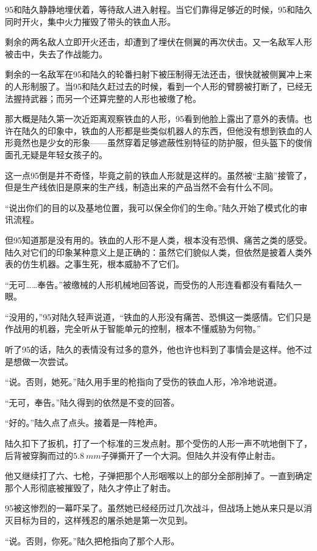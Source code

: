 95和陆久静静地埋伏着，等待敌人进入射程。当它们靠得足够近的时候，95和陆久同时开火，集中火力摧毁了带头的铁血人形。

剩余的两名敌人立即开火还击，却遭到了埋伏在侧翼的再次伏击。又一名敌军人形被击中，失去了作战能力。

剩余的一名敌军在95和陆久的轮番扫射下被压制得无法还击，很快就被侧翼冲上来的人形制服了。当95和陆久赶过去的时候，看到一个人形的臂膀被打断了，已经无法握持武器；而另一个还算完整的人形也被缴了枪。

那大概是陆久第一次近距离观察铁血的人形，95看到他脸上露出了意外的表情。也许在陆久的印象中，铁血的人形都是些类似机器人的东西，但他没有想到铁血的人形竟然也是少女的形象——虽然穿着足够遮蔽性别特征的防护服，但头盔下的俊俏面孔无疑是年轻女孩子的。

这一点95倒是并不奇怪，毕竟之前的铁血人形就是这样的。虽然被“主脑”接管了，但是生产线依旧是原来的生产线，制造出来的产品当然不会有什么不同。

“说出你们的目的以及基地位置，我可以保全你们的生命。”陆久开始了模式化的审讯流程。

但95知道那是没有用的。铁血的人形不是人类，根本没有恐惧、痛苦之类的感受。陆久对它们的印象某种意义上是正确的：虽然它们貌似人类，但依然是披着人类外表的仿生机器。之事生死，根本威胁不了它们。

“无可……奉告。”被缴械的人形机械地回答说，而受伤的人形连看都没有看陆久一眼。

“没用的，”95对陆久轻声说道，“铁血的人形没有痛苦、恐惧这一类感情。它们只是作战用的机器，完全听从于智能单元的控制，根本不懂威胁为何物。”

听了95的话，陆久的表情没有过多的意外，他也许也料到了事情会是这样。他不过是想做一次尝试。

“说。否则，她死。”陆久用手里的枪指向了受伤的铁血人形，冷冷地说道。

“无可，奉告。”陆久得到的依然是不变的回答。

“好的。”陆久点了点头。接着是一阵枪声。

陆久扣下了扳机，打了一个标准的三发点射。那个受伤的人形一声不吭地倒下了，后背被穿胸而过的$\SI{5.8}{mm}$子弹撕开了一个大洞。但陆久并没有停止射击。

他又继续打了六、七枪，子弹把那个人形咽喉以上的部分全部削掉了。一直到确定那个人形彻底被摧毁了，陆久才停止了射击。

95被这惨烈的一幕吓呆了。虽然她已经经历过几次战斗，但战场上她从来只是以消灭目标为目的，这样残忍的屠杀她是第一次见到。

“说。否则，你死。”陆久把枪指向了那个人形。

